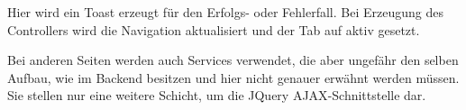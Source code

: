 Hier wird ein Toast erzeugt für den Erfolgs- oder Fehlerfall. Bei Erzeugung des Controllers wird die Navigation aktualisiert und der Tab auf aktiv gesetzt.

Bei anderen Seiten werden auch Services verwendet, die aber ungefähr den selben Aufbau, wie im Backend besitzen und hier nicht genauer erwähnt werden müssen. Sie stellen nur eine weitere Schicht, um die JQuery \gls{AJAX}-Schnittstelle dar.